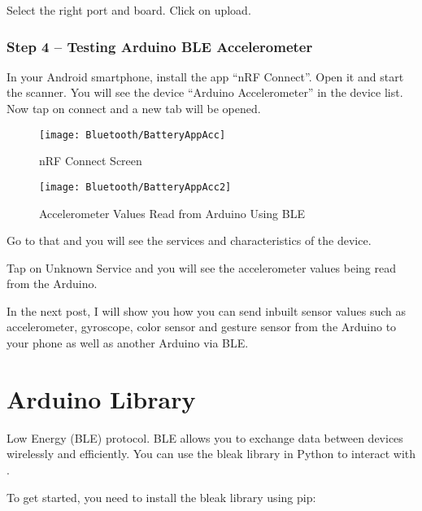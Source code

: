 Select the right port and board. Click on upload.

\subsubsection{Step 4 -- Testing Arduino BLE Accelerometer}

In your Android smartphone, install the app ``nRF Connect''. Open it and start the scanner. You will see the device “Arduino Accelerometer” in the device list. Now tap on connect and a new tab will be opened.

\begin{figure}
    \centering
    \texttt{[image: Bluetooth/BatteryAppAcc]}
    \caption{nRF Connect Screen}    
\end{figure}

\begin{figure}
    \centering
    \texttt{[image: Bluetooth/BatteryAppAcc2]}
    \caption{Accelerometer Values Read from Arduino Using BLE}    
\end{figure}

Go to that and you will see the services and characteristics of the device.

Tap on Unknown Service and you will see the accelerometer values being read from the Arduino.

In the next post, I will show you how you can send inbuilt sensor values such as accelerometer, gyroscope, color sensor and gesture sensor from the Arduino to your phone as well as another Arduino via BLE.









\section{Arduino Library }

Low Energy (BLE) protocol. BLE allows you to exchange data between devices wirelessly and efficiently. You can use the bleak library in Python to interact with .

To get started, you need to install the bleak library using pip:

\medskip



